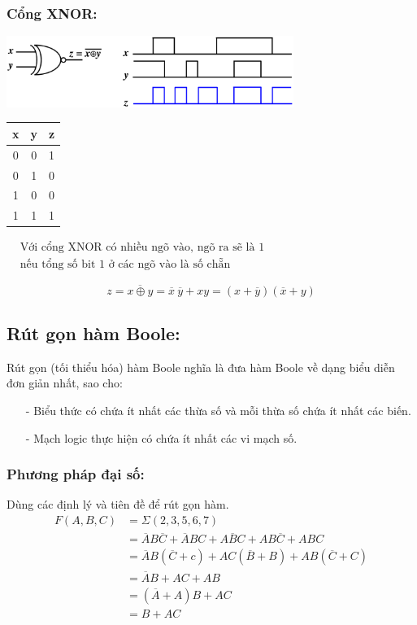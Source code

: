 \subsubsection{Cổng XNOR:}
\begin{center}
    \includegraphics[width = 0.7\textwidth]{./local/image/26.png}
\end{center}
\begin{table}[h!]
    \centering
    \begin{tabular}{|cc|c|}
    \hline
    \textbf{x} & \textbf{y} & \textbf{z} \\ \hline
    0          & 0          & 1                      \\
    0          & 1          & 0                      \\
    1          & 0          & 0                      \\
    1          & 1          & 1                      \\ \hline
    \end{tabular} \qquad
    $\begin{aligned}
        &\text{Với cổng XNOR có nhiều ngõ vào, ngõ ra sẽ là 1}\\
        &\text{nếu tổng số bit 1 ở các ngõ vào là số chẵn}
    \end{aligned}$
\end{table}
\[
    z = \overline{x \oplus y} = \overline{x}\ \overline{y} +xy = (x+\overline{y})(\overline{x} + y)
\]
\subsection{Rút gọn hàm Boole:}
Rút gọn (tối thiểu hóa) hàm Boole nghĩa là đưa hàm Boole về dạng biểu diễn đơn giản nhất, sao cho:
\begin{itemize}
    \item[-] Biểu thức có chứa ít nhất các thừa số và mỗi thừa số chứa ít nhất các biến.
    \item[-]  Mạch logic thực hiện có chứa ít nhất các vi mạch số.
\end{itemize}
\subsubsection{Phương pháp đại số:}
Dùng các định lý và tiên đề để rút gọn hàm.
\[
    \begin{aligned}
        F(A,B,C) &= \varSigma(2,3,5,6,7) \\
                 &= \overline{A}B\overline{C} + \overline{A}BC + A\overline{B}C + AB\overline{C} + ABC\\
                 &= \overline{A}B(\overline{C} + c) + AC(\overline{B} + B) + AB(\overline{C} + C)\\
                 &= \overline{A}B + AC + AB\\
                 &= (\overline{A}+A)B + AC\\
                 &= B + AC
    \end{aligned}
\]
